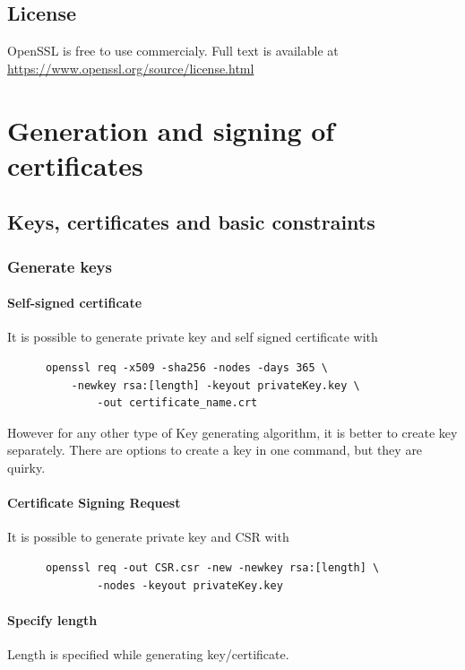 \documentclass[10pt, a4paper]{report}
\begin{document}
  
  \subsection{License}
OpenSSL is free to use commercialy. Full text is available at \url{https://www.openssl.org/source/license.html}  
\section{Generation and signing of certificates}

  \subsection{Keys, certificates and basic constraints}
  
    \subsubsection{Generate keys}
    
      \paragraph{Self-signed certificate}
      It is possible to generate private key and self signed certificate with 
      \begin{verbatim}
      openssl req -x509 -sha256 -nodes -days 365 \
	      -newkey rsa:[length] -keyout privateKey.key \
              -out certificate_name.crt
      \end{verbatim}

However for any other type of Key generating algorithm, it is better to create key separately. There are options to create a key in one command, but they are quirky.

      \paragraph{Certificate Signing Request}
      It is possible to generate private key and CSR with
      \begin{verbatim}
      openssl req -out CSR.csr -new -newkey rsa:[length] \
              -nodes -keyout privateKey.key
      \end{verbatim}
      
      \paragraph{Specify length}
      Length is specified while generating key/certificate.
      
\end{document}
